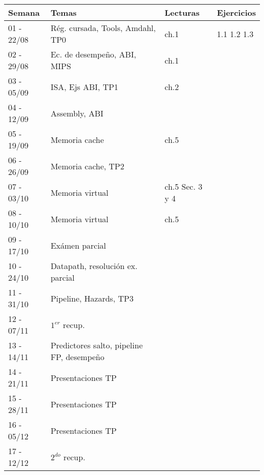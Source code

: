 \documentclass[9pt,a4paper]{article}
\begin{document}
\begin{tabular}{ |l | l | l | l |}
\hline
Semana & Temas			& Lecturas     & Ejercicios						\\
\hline
01 - 22/08	& Rég. cursada, Tools, Amdahl, TP0 		& ch.1 \cite{caaqa}	&	1.1 1.2 1.3		\\
\hline
02 - 29/08	& Ec. de desempeño, ABI, MIPS & ch.1 \cite{caaqa}    &	\\
\hline
03 - 05/09	& ISA, Ejs ABI, TP1					&		ch.2 \cite{caaqa}	&			\\
\hline
04 - 12/09	& Assembly, ABI 	& 	 &	\\
\hline
05 - 19/09	& Memoria cache	& 	ch.5 \cite{caaqa}	&	\\
\hline
06 - 26/09	& Memoria cache, TP2	& 		&		\\
\hline
07 - 03/10	& Memoria virtual	& 		ch.5 \cite{caaqa} Sec. 3 y 4 \cite{wepskam}&	 \\
\hline
08 - 10/10	& Memoria virtual	&	\cite{wepskam} ch.5 \cite{caaqa} \cite{vmp1} \cite{vmp2} &	 \\
\hline
\rowcolor{green} 09 - 17/10	& Exámen parcial	& 	&	 \\
\hline
10 - 24/10	& Datapath, resolución ex. parcial	&		&							\\
\hline
 11 - 31/10	& Pipeline, Hazards, TP3	& 	&								\\
\hline
\rowcolor{green}12 - 07/11	& $1^{er}$ recup.			& 	 & \\
\hline
13 - 14/11 & Predictores salto, pipeline FP, desempeño			& 	&	\\
\hline
 14 - 21/11 & Presentaciones TP	&		&							\\
\hline
 15 - 28/11	& Presentaciones TP			&	&								\\
\hline
16 - 05/12 & Presentaciones TP 	&			& \\
\hline
\rowcolor{green} 17 - 12/12 & $2^{do}$ recup.			&		& \\
\hline

\end{tabular}

\renewcommand\refname{Lecturas}
\end{document}
